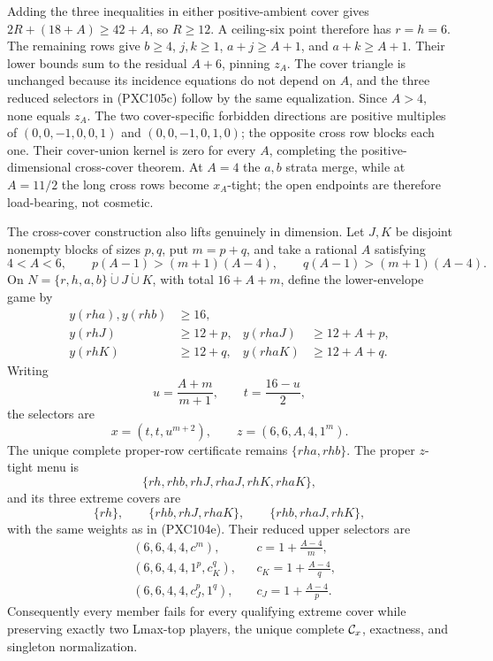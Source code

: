 \documentclass[11pt]{article}
\begin{document}
Adding the three inequalities in either positive-ambient cover gives
\(2R+(18+A)\ge42+A\), so \(R\ge12\).  A ceiling-six point therefore has
\(r=h=6\).  The remaining rows give
\(b\ge4\), \(j,k\ge1\), \(a+j\ge A+1\), and \(a+k\ge A+1\).
Their lower bounds sum to the residual \(A+6\), pinning \(z_A\).
The cover triangle is unchanged because its incidence equations do not
depend on \(A\), and the three reduced selectors in (PXC105c) follow by
the same equalization.  Since \(A>4\), none equals \(z_A\).  The two
cover-specific forbidden directions are positive multiples of
\((0,0,-1,0,0,1)\) and \((0,0,-1,0,1,0)\); the opposite cross row blocks
each one.  Their cover-union kernel is zero for every \(A\), completing
the positive-dimensional cross-cover theorem.  At \(A=4\) the \(a,b\)
strata merge, while at \(A=11/2\) the long cross rows become \(x_A\)-tight;
the open endpoints are therefore load-bearing, not cosmetic.

The cross-cover construction also lifts genuinely in dimension.  Let
\(J,K\) be disjoint nonempty blocks of sizes \(p,q\), put \(m=p+q\), and
take a rational \(A\) satisfying
\begin{equation}
 4<A<6,\qquad
 p(A-1)>(m+1)(A-4),\qquad
 q(A-1)>(m+1)(A-4).                                          \tag{PXC106a}
\end{equation}
On \(N=\{r,h,a,b\}\dot\cup J\dot\cup K\), with total \(16+A+m\),
define the lower-envelope game by
\begin{equation}
\begin{aligned}
 y(rha),y(rhb)&\ge16,\\
 y(rhJ)&\ge12+p,& y(rhaJ)&\ge12+A+p,\\
 y(rhK)&\ge12+q,& y(rhaK)&\ge12+A+q.
\end{aligned}                                                 \tag{PXC106b}
\end{equation}
Writing
\[
 u=\frac{A+m}{m+1},\qquad t=\frac{16-u}{2},
\]
the selectors are
\begin{equation}
 x=(t,t,u^{m+2}),\qquad z=(6,6,A,4,1^m).                     \tag{PXC106c}
\end{equation}
The unique complete proper-row certificate remains \(\{rha,rhb\}\).
The proper \(z\)-tight menu is
\[
 \{rh,rhb,rhJ,rhaJ,rhK,rhaK\},
\]
and its three extreme covers are
\begin{equation}
 \{rh\},\qquad \{rhb,rhJ,rhaK\},\qquad
 \{rhb,rhaJ,rhK\},                                          \tag{PXC106d}
\end{equation}
with the same weights as in (PXC104e).  Their reduced upper selectors are
\begin{equation}
\begin{aligned}
 &(6,6,4,4,c^m),&&c=1+\frac{A-4}{m},\\
 &(6,6,4,4,1^p,c_K^q),&&c_K=1+\frac{A-4}{q},\\
 &(6,6,4,4,c_J^p,1^q),&&c_J=1+\frac{A-4}{p}.
\end{aligned}                                                 \tag{PXC106e}
\end{equation}
Consequently every member fails for every qualifying extreme cover while
preserving exactly two Lmax-top players, the unique complete \({\cal C}_x\),
exactness, and singleton normalization.
\end{document}
